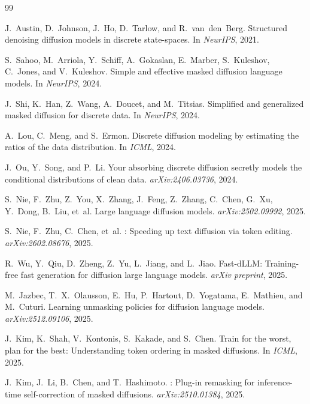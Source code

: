 \documentclass[11pt]{article}
\begin{document}

\begin{thebibliography}{99}

J.~Austin, D.~Johnson, J.~Ho, D.~Tarlow, and R.~van~den~Berg.
\newblock Structured denoising diffusion models in discrete state-spaces.
\newblock In \emph{NeurIPS}, 2021.

S.~Sahoo, M.~Arriola, Y.~Schiff, A.~Gokaslan, E.~Marber, S.~Kuleshov, C.~Jones, and V.~Kuleshov.
\newblock Simple and effective masked diffusion language models.
\newblock In \emph{NeurIPS}, 2024.

J.~Shi, K.~Han, Z.~Wang, A.~Doucet, and M.~Titsias.
\newblock Simplified and generalized masked diffusion for discrete data.
\newblock In \emph{NeurIPS}, 2024.

A.~Lou, C.~Meng, and S.~Ermon.
\newblock Discrete diffusion modeling by estimating the ratios of the data distribution.
\newblock In \emph{ICML}, 2024.

J.~Ou, Y.~Song, and P.~Li.
\newblock Your absorbing discrete diffusion secretly models the conditional distributions of clean data.
\newblock \emph{arXiv:2406.03736}, 2024.

S.~Nie, F.~Zhu, Z.~You, X.~Zhang, J.~Feng, Z.~Zhang, C.~Chen, G.~Xu, Y.~Dong, B.~Liu, et~al.
\newblock Large language diffusion models.
\newblock \emph{arXiv:2502.09992}, 2025.

S.~Nie, F.~Zhu, C.~Chen, et~al.
: Speeding up text diffusion via token editing.
\newblock \emph{arXiv:2602.08676}, 2025.

R.~Wu, Y.~Qiu, D.~Zheng, Z.~Yu, L.~Jiang, and L.~Jiao.
\newblock Fast-{dLLM}: Training-free fast generation for diffusion large language models.
\newblock \emph{arXiv preprint}, 2025.

M.~Jazbec, T.~X.~Olausson, E.~Hu, P.~Hartout, D.~Yogatama, E.~Mathieu, and M.~Cuturi.
\newblock Learning unmasking policies for diffusion language models.
\newblock \emph{arXiv:2512.09106}, 2025.

J.~Kim, K.~Shah, V.~Kontonis, S.~Kakade, and S.~Chen.
\newblock Train for the worst, plan for the best: Understanding token ordering in masked diffusions.
\newblock In \emph{ICML}, 2025.

J.~Kim, J.~Li, B.~Chen, and T.~Hashimoto.
: Plug-in remasking for inference-time self-correction of masked diffusions.
\newblock \emph{arXiv:2510.01384}, 2025.


\end{thebibliography}
\end{document}
